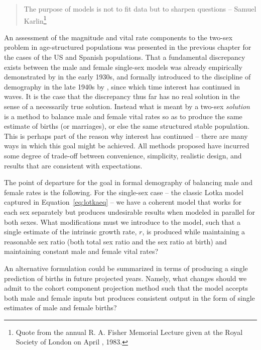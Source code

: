  \FloatBarrier
\label{sec:modelingapproaches}
\begin{singlespace}
\begin{quote}
The purpose of models is not to fit data but to sharpen questions -- Samuel
Karlin\footnote{Quote from the  annual R. A. Fisher Memorial Lecture
given at the Royal Society of London on April , 1983.}
\end{quote}
\end{singlespace}

An assessment of the magnitude and vital rate components to the two-sex
problem in age-structured populations was presented in the previous
chapter for the cases of the US and Spanish populations. That a fundamental
discrepancy exists between the male and female single-sex models was already
empirically demonstrated by \citet{kuczynski1932fertility} in the early 1930s, 
and formally introduced to
the discipline of demography in the late 1940s by
\citet{karmel1947relations, karmel1948measurement}, since which time interest
has continued in waves. It is the case that the discrepancy thus far has no real 
solution in the sense of a necessarily true
solution. Instead what is meant by a two-sex \textit{solution} is a method to
balance male and female vital rates so as to produce the same estimate of births (or marriages), 
or else the same structured stable population. This is
perhaps part of the reason why interest has continued -- there are many ways in
which this goal might be achieved. All methods proposed have incurred some degree of trade-off
between convenience, simplicity, realistic design, and results that are
consistent with expectations.
 
The point of departure for the goal in formal demography of balancing male and
female rates is the following. For the single-sex case -- the classic Lotka
model captured in Equation~\eqref{eq:lotkaeq} -- we have a coherent model that
works for each sex separately but produces undesirable results when modeled in parallel for both
sexes. What modifications must we introduce to the model, such that a single
estimate of the intrinsic growth rate, $r$, is produced while maintaining a
reasonable sex ratio (both total sex ratio and the sex ratio at birth) and
maintaining constant male and female vital rates? 

An alternative formulation
could be summarized in terms of producing a single prediction of births in
future projected years. Namely, what changes should we admit to the cohort
component projection method such that the model accepts both male and
female inputs but produces consistent output in the form of single estimates of
male and female births?


